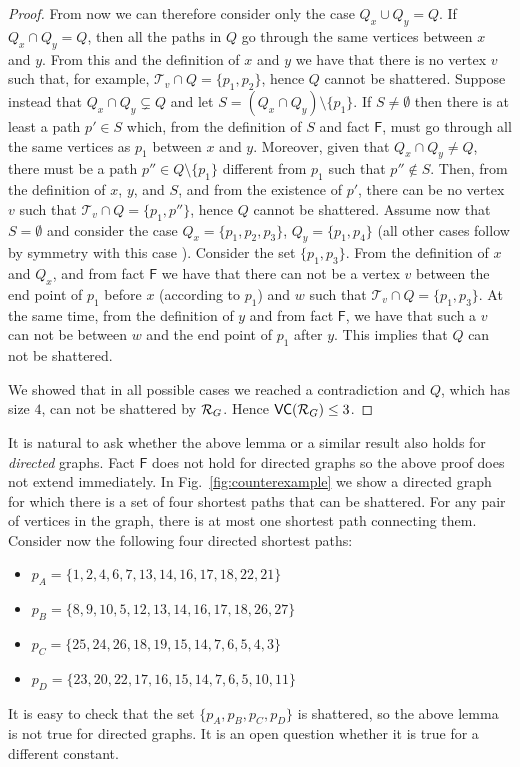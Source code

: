 \begin{proof}
  
  From now we can therefore consider only the case $Q_x\cup Q_y=Q$. If $Q_x\cap
  Q_y=Q$, then all the paths in $Q$ go through the same vertices between $x$ and
  $y$. From this and the definition of $x$ and $y$ we have that there is no
  vertex $v$ such that, for example, $\mathcal{T}_v\cap Q=\{p_1,p_2\}$, hence
  $Q$ cannot be shattered. Suppose instead that $Q_x\cap Q_y\subsetneq Q$ and let $S=(Q_x\cap
  Q_y)\setminus\{p_1\}$. If $S\neq\emptyset$ then there is at least a path
  $p'\in S$ which, from the definition of $S$ and fact $\mathsf{F}$, must go
  through all the same vertices as $p_1$ between $x$ and $y$. Moreover, given
  that $Q_x\cap Q_y\neq Q$, there must be a path $p''\in Q\setminus\{p_1\}$
  different from $p_1$ such that $p''\notin S$. Then, from the definition of
  $x$, $y$, and $S$, and from the existence of $p'$, there can be no vertex $v$
  such that $\mathcal{T}_v\cap Q=\{p_1,p''\}$, hence $Q$ cannot be shattered.
  Assume now that $S=\emptyset$ and consider the case $Q_x=\{p_1,p_2,p_3\}$,
  $Q_y=\{p_1,p_4\}$ (all other cases follow by symmetry with this case ).
  Consider the set $\{p_1,p_3\}$. From the definition of $x$ and $Q_x$, and from
  fact $\mathsf{F}$ we have that there can not be a vertex $v$ between the end
  point of $p_1$ before $x$ (according to $p_1$) and $w$ such that $\mathcal{T}_v\cap Q=\{p_1,p_3\}$.
  At the same time, from the definition of $y$ and from fact $\mathsf{F}$, we
  have that such a $v$ can not be between $w$ and the end point of $p_1$ after
  $y$. This implies that $Q$ can not be shattered.

  We showed that in all possible cases we reached a contradiction and $Q$,
  which has size $4$, can not be shattered by $\mathcal{R}_G$. Hence $\mathsf{VC}(\mathcal{R}_G)\le
  3$.
\end{proof}

It is natural to ask whether the above lemma or a similar result also holds for
\emph{directed} graphs. Fact $\mathsf{F}$ does not hold for directed graphs so
the above proof does not extend immediately. In Fig.~\ref{fig:counterexample} we show
a directed graph for which there is a set of four shortest paths that can
be shattered. For any pair of vertices in the graph, there is at most one
shortest path connecting them. Consider now the
following four directed shortest paths:
\begin{itemize}
  \item $p_A=\{1,2,4,6,7,13,14,16,17,18,22,21\}$
  \item $p_B=\{8,9,10,5,12,13,14,16,17,18,26,27\}$
  \item $p_C=\{25,24,26,18,19,15,14,7,6,5,4,3\}$
  \item $p_D=\{23,20,22,17,16,15,14,7,6,5,10,11\}$
\end{itemize}
It is easy to check that the set $\{p_A,p_B,p_C,p_D\}$ is shattered, so the
above lemma is not true for directed graphs. It is an open question whether it is
true for a different constant.

